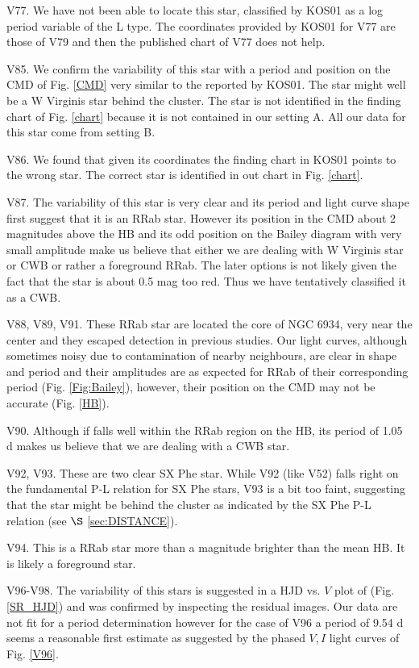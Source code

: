 \documentclass[journal]{rmaa}
\newcommand{\1}{\'{\i}}
\begin{document}
V77. We have not been able to locate this star, classified by KOS01 as a log period variable
of the L type. The coordinates provided by KOS01 for V77 are those of V79 and then
the published chart of V77 does not help.

V85. We confirm the variability of this star with a period and position on the CMD
of Fig. \ref{CMD} very similar to the reported by KOS01. The star might well be a W
Virginis star behind the cluster. The star is not identified in the finding chart of
Fig. \ref{chart} because it is not contained in our setting A. All our data for this
star come from setting B.

V86. We found that given its coordinates the finding chart in KOS01 points to the
wrong star. The correct star is identified in out chart in Fig. \ref{chart}.

V87. The variability of this star is very clear and its period and light curve shape
first suggest that it is an RRab star. However its position in the CMD about 2
magnitudes above the HB and its odd position on the Bailey diagram with very small
amplitude make us believe that either we are dealing with W Virginis star or CWB or
rather a foreground RRab. The later options is not likely given the fact that the
star is about 0.5 mag too red. Thus we have tentatively classified it as a CWB.

V88, V89, V91. These RRab star are located the core of NGC 6934, very near the center
and
they escaped detection in previous studies. Our light curves, although sometimes
noisy due to contamination of nearby neighbours, are clear in shape and period
and their amplitudes are as expected for RRab of their corresponding period (Fig.
\ref{Fig:Bailey}), however, their position on the CMD may not be accurate (Fig.
\ref{HB}).

V90. Although if falls well within the RRab region on the HB, its period of 1.05 d
makes us believe that we are dealing with a CWB star.

V92, V93. These are two clear SX Phe star. While V92 (like V52) falls right on the
fundamental P-L relation for SX Phe stars, V93 is a bit too faint, suggesting that
the star might be behind the cluster as indicated by the SX Phe P-L relation (see
$\S$ \ref{sec:DISTANCE}).

V94. This is a RRab star more than a magnitude brighter than the mean HB. It is likely
a foreground star.

V96-V98. The variability of this stars is suggested in a HJD vs. $V$ plot of (Fig.
\ref{SR_HJD}) and was confirmed by inspecting the residual images. Our data are not
fit for a period determination however for the case of V96 a period of 9.54 d seems a
reasonable first estimate as suggested by the
phased $V,I$ light curves of Fig. \ref{V96}.
\end{document}
